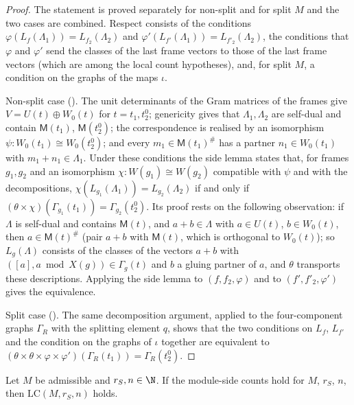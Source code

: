 \begin{proof}
The statement is proved separately for non-split and for split $M$ and the two cases are combined. Respect consists of the
conditions $\varphi(L_f(\Lambda_1))=L_{f_2}(\Lambda_2)$ and $\varphi'(L_{f'}(\Lambda_1))=L_{f'_2}(\Lambda_2)$, the conditions that $\varphi$ and $\varphi'$
send the classes of the last frame vectors to those of the last frame vectors (which are among the local count hypotheses), and,
for split $M$, a condition on the graphs of the maps $\iota$.

Non-split case (). The unit determinants of the Gram matrices of the frames give
$V=U(t)\oplus W_0(t)$ for $t=t_1,t_2^0$; genericity gives that $\Lambda_1,\Lambda_2$ are self-dual and contain $\mathsf M(t_1)$, $\mathsf M(t_2^0)$;
the correspondence is realised by an isomorphism $\psi:W_0(t_1)\cong W_0(t_2^0)$; and every $m_1\in\mathsf M(t_1)^\#$ has a partner $n_1\in W_0(t_1)$
with $m_1+n_1\in\Lambda_1$. Under these conditions the side lemma  states that, for frames
$g_1,g_2$ and an isomorphism $\chi:W(g_1)\cong W(g_2)$ compatible with $\psi$ and with the decompositions, $\chi(L_{g_1}(\Lambda_1))=L_{g_2}(\Lambda_2)$ if
and only if $(\theta\times\chi)(\Gamma_{g_1}(t_1))=\Gamma_{g_2}(t_2^0)$. Its proof rests on the following observation: if $\Lambda$ is self-dual and
contains $\mathsf M(t)$, and $a+b\in\Lambda$ with $a\in U(t)$, $b\in W_0(t)$, then $a\in\mathsf M(t)^\#$ (pair $a+b$ with $\mathsf M(t)$, which is orthogonal to
$W_0(t)$); so $L_g(\Lambda)$ consists of the classes of the vectors $a+b$ with $([a],a\bmod X(g))\in\Gamma_g(t)$ and $b$ a gluing partner of $a$,
and $\theta$ transports these descriptions. Applying the side lemma to $(f,f_2,\varphi)$ and to $(f',f'_2,\varphi')$ gives the equivalence.

Split case (). The same decomposition argument, applied to the four-component graphs
$\Gamma_R$ with the splitting element $q$, shows that the two conditions on $L_f$, $L_{f'}$ and the condition on the graphs of $\iota$
together are equivalent to $(\theta\times\theta\times\varphi\times\varphi')(\Gamma_R(t_1))=\Gamma_R(t_2^0)$.
\end{proof}

\begin{proposition}\label{pf:thmS-leaves:prop:lcmod}
Let $M$ be admissible and $r_S,n\in\N$. If the module-side counts hold for $M$, $r_S$, $n$, then $\mathrm{LC}(M,r_S,n)$ holds.
\end{proposition}

